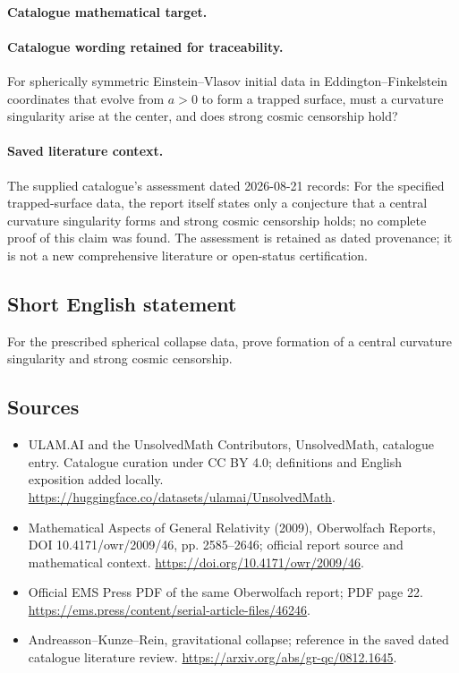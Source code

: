 \documentclass[11pt]{article}
\begin{document}
\paragraph{Catalogue mathematical target.}
\paragraph{Catalogue wording retained for traceability.}
For spherically symmetric Einstein–Vlasov initial data in Eddington–Finkelstein coordinates that evolve from $a>0$ to form a trapped surface, must a curvature singularity arise at the center, and does strong cosmic censorship hold?

\paragraph{Saved literature context.} The supplied catalogue's assessment dated 2026-08-21 records: For the specified trapped-surface data, the report itself states only a conjecture that a central curvature singularity forms and strong cosmic censorship holds; no complete proof of this claim was found. The assessment is retained as dated provenance; it is not a new comprehensive literature or open-status certification.
\subsection{Short English statement}
For the prescribed spherical collapse data, prove formation of a central curvature singularity and strong cosmic censorship.
\subsection{Sources}
\begin{itemize}
\item[\hypertarget{source:statement:1}{S1}] ULAM.AI and the UnsolvedMath Contributors, UnsolvedMath, catalogue entry. Catalogue curation under CC BY 4.0; definitions and English exposition added locally.
\url{https://huggingface.co/datasets/ulamai/UnsolvedMath}.
\item[\hypertarget{source:statement:2}{S2}] Mathematical Aspects of General Relativity (2009), Oberwolfach Reports, DOI 10.4171/owr/2009/46, pp. 2585--2646; official report source and mathematical context.
\url{https://doi.org/10.4171/owr/2009/46}.
\item[\hypertarget{source:statement:3}{S3}] Official EMS Press PDF of the same Oberwolfach report; PDF page 22.
\url{https://ems.press/content/serial-article-files/46246}.
\item[\hypertarget{source:statement:4}{S4}] Andreasson--Kunze--Rein, gravitational collapse; reference in the saved dated catalogue literature review.
\url{https://arxiv.org/abs/gr-qc/0812.1645}.
\end{itemize}
\label{end:statement}
\end{document}
